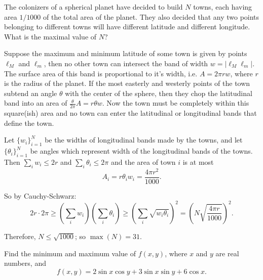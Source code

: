 \documentclass[12pt,a4paper]{memoir}
\theoremstyle{definition}
\begin{document}
\begin{question}
	The colonizers of a spherical planet have decided to build $N$ towns, each having area $1/1000$ of the total area of the planet. They also decided that any two points belonging to different towns will have different latitude and different longitude. What is the maximal value of $N$?
\end{question}





\begin{solution}[name={Solution by Ocha}] 
	Suppose the maximum and minimum latitude of some town is given by points $\ell_M$ and $\ell_m$, then no other town can intersect the band of width $w=|\ell_M\ell_m|$. The surface area of this band is proportional to it's width, i.e. $A = 2\pi r w$, where $r$ is the radius of the planet. If the most easterly and westerly points of the town subtend an angle $\theta$ with the center of the sphere, then they chop the latitudinal band into an area of $\frac{\theta}{2\pi}A = r \theta w$. Now the town must be completely within this square(ish) area and no town can enter the latitudinal or longitudinal bands that define the town.
	
	Let $\{w_i\}_{i=1}^N$ be the widths of longitudinal bands made by the towns, and let $\{\theta_i\}_{i=1}^N$ be angles which represent width of the longitudinal bands of the towns. Then $\sum_i w_i \le 2r$ and $\sum_i \theta_i \le 2\pi$ and the area of town $i$ is at most $$A_i = r \theta_i w_i = \frac{4\pi r^2}{1000}.$$
	
	So by Cauchy-Schwarz: $$2r \cdot 2 \pi \ge \left(\sum_i w_i \right)\left(\sum_i \theta_i \right) \ge \left(\sum_i\sqrt{ w_i \theta_i}\right)^2 = \left(N \sqrt{\frac{4\pi r}{1000}}\right)^2.$$
	
	Therefore, $N \le \sqrt{1000}$; so $\max(N) = 31$.
\end{solution}






\begin{question}
	Find the minimum and maximum value of $f(x,y)$, where $x$ and $y$ are real numbers, and
	\[
	f(x,y) = 2\sin{x}\cos{y} + 3\sin{x}\sin{y} + 6\cos{x}.
	\]
\end{question}
\end{document}
